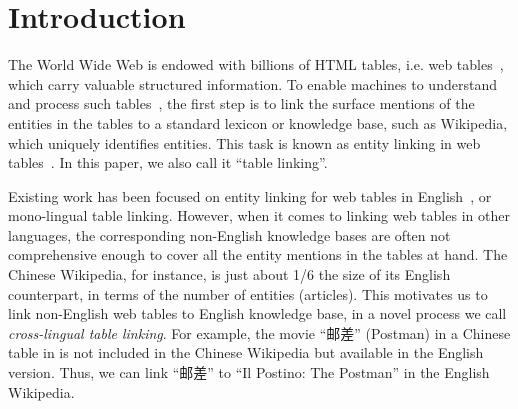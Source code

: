  \section{Introduction}
\label{sec:intro}

The World Wide Web is endowed with billions of HTML tables,
i.e. web tables~\cite{cafarella2008webtables,wang2012understanding}, which carry
valuable structured information. To enable machines to understand and process 
such tables~\cite{wang2012understanding},
the first step is to link the surface mentions of the entities in the 
tables to a standard lexicon or knowledge base, such as Wikipedia, which 
uniquely identifies entities. This task is
known as entity linking in web tables~\cite{bhagavatula2015tabel,wu2016entity}.
In this paper, we also call it ``table linking''.

Existing work has been focused on entity linking for web tables 
in English~\cite{bhagavatula2015tabel,limaye2010annotating}, or mono-lingual table linking.
However, when it comes to linking web tables in other languages, the corresponding
non-English knowledge bases are often not comprehensive enough to cover all the entity mentions 
in the tables at hand.  The Chinese Wikipedia, for instance, is just about 1/6 the size of
its English counterpart, in terms of the number of entities (articles). This motivates us to
link non-English web tables to English knowledge base, in a novel process we call {\em cross-lingual
table linking}.
For example, the movie ``邮差'' (Postman) in a Chinese table in 
 is not included in the Chinese Wikipedia but available in 
the English version. Thus, we can link  ``邮差'' to ``Il Postino: The Postman'' in the English Wikipedia.

